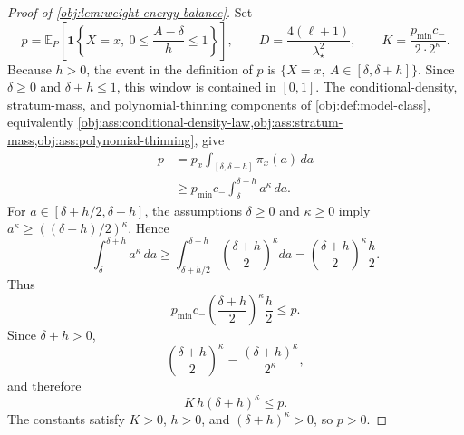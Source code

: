 \documentclass[11pt]{article}
\begin{document}
\begin{proof}[Proof of \cref{obj:lem:weight-energy-balance}]
Set
\[
        p=\mathbb E_P\!\left[
        \mathbf 1\!\left\{X=x,\ 0\le\frac{A-\delta}{h}\le1\right\}\right],
        \qquad
        D=\frac{4(\ell+1)}{\lambda_\star^2},
        \qquad
        K=\frac{p_{\min}c_-}{2\cdot 2^\kappa}.
\]
Because \(h>0\), the event in the definition of \(p\) is
\(\{X=x,\ A\in[\delta,\delta+h]\}\).  Since
\(\delta\ge0\) and \(\delta+h\le1\), this window is contained in
\([0,1]\).  The conditional-density, stratum-mass, and polynomial-thinning
components of \cref{obj:def:model-class}, equivalently
\cref{obj:ass:conditional-density-law,obj:ass:stratum-mass,obj:ass:polynomial-thinning}, give
\[
\begin{aligned}
        p
        &=p_x\int_{[\delta,\delta+h]}\pi_x(a)\,da \\
        &\ge p_{\min}c_-\int_{\delta}^{\delta+h}a^\kappa\,da .
\end{aligned}
\]
For \(a\in[\delta+h/2,\delta+h]\), the assumptions
\(\delta\ge0\) and \(\kappa\ge0\) imply
\(a^\kappa\ge((\delta+h)/2)^\kappa\).  Hence
\[
        \int_{\delta}^{\delta+h}a^\kappa\,da
        \ge
        \int_{\delta+h/2}^{\delta+h}
        \left(\frac{\delta+h}{2}\right)^\kappa da
        =
        \left(\frac{\delta+h}{2}\right)^\kappa\frac h2 .
\]
Thus
\[
        p_{\min}c_-\left(\frac{\delta+h}{2}\right)^\kappa\frac{h}{2}
        \le p .
\]
Since \(\delta+h>0\),
\[
        \left(\frac{\delta+h}{2}\right)^\kappa
        =
        \frac{(\delta+h)^\kappa}{2^\kappa},
\]
and therefore
\[
        K\,h(\delta+h)^\kappa\le p .
\]
The constants satisfy \(K>0\), \(h>0\), and \((\delta+h)^\kappa>0\), so \(p>0\).


\end{proof}
\end{document}
